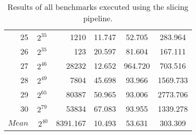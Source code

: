 \begin{table}[b!]
\begin{tabular}{rSrSSS}
    25 & {$2^{35}$} & 1210 & 11.747 & 52.705 & 283.964 \\
    26 & {$2^{35}$} & 123 & 20.597 & 81.604 & 167.111 \\
    27 & {$2^{46}$} & 28232 & 12.652 & 964.720 & 703.516 \\
    28 & {$2^{49}$} & 7804 & 45.698 & 93.966 & 1569.733 \\
    29 & {$2^{65}$} & 80387 & 50.965 & 93.006 & 2773.706 \\
    30 & {$2^{79}$} & 53834 & 67.083 & 93.955 & 1339.278 \\	\midrule
	{$Mean$} & {$~2^{40}$} & 8391.167 & 10.493 & 53.631 & 303.309 \\	\bottomrule
\end{tabular}
\caption{Results of all benchmarks executed using the slicing pipeline.}
\label{tab:resultsslicing}
\end{table}

